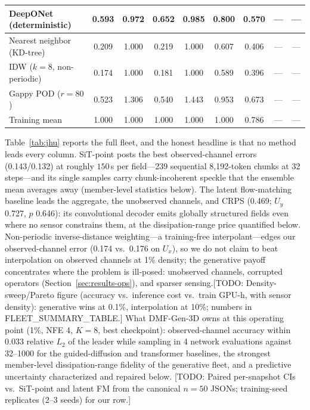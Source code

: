 \documentclass{article} %
\newcommand{\todo}[1]{{\color{red}[TODO: #1]}}
\newcommand{\model}{DMF-Gen-3D}
\begin{document}
\begin{table}[tbp]
\begin{center}
\begin{tabular}{lcccccccc}
DeepONet (deterministic) & 0.593 & 0.972 & 0.652 & 0.985 & 0.800 & 0.570 & --- & --- \\
\midrule
Nearest neighbor (KD-tree) & 0.209 & 1.000 & 0.219 & 1.000 & 0.607 & 0.406 & --- & --- \\
IDW ($k{=}8$, non-periodic) & 0.174 & 1.000 & 0.181 & 1.000 & 0.589 & 0.396 & --- & --- \\
Gappy POD ($r{=}80$) & 0.523 & 1.306 & 0.540 & 1.443 & 0.953 & 0.673 & --- & --- \\
Training mean & 1.000 & 1.000 & 1.000 & 1.000 & 1.000 & 0.786 & --- & --- \\
\bottomrule
\end{tabular}
\end{center}
\end{table}

Table~\ref{tab:jhu} reports the full fleet, and the honest headline is that no method leads every column. SiT-point posts the best observed-channel errors (0.143/0.132) at roughly $150$\,s per field---239 sequential 8{,}192-token chunks at 32 steps---and its single samples carry chunk-incoherent speckle that the ensemble mean averages away (member-level statistics below). The latent flow-matching baseline leads the aggregate, the unobserved channels, and CRPS (0.469; $U_y$ 0.727, $p$ 0.646): its convolutional decoder emits globally structured fields even where no sensor constrains them, at the dissipation-range price quantified below. Non-periodic inverse-distance weighting---a training-free interpolant---edges our observed-channel error (0.174 vs.\ 0.176 on $U_x$), so we do not claim to beat interpolation on observed channels at 1\% density; the generative payoff concentrates where the problem is ill-posed: unobserved channels, corrupted operators (Section~\ref{sec:results-ops}), and sparser sensing.\todo{Density-sweep/Pareto figure (accuracy vs.\ inference cost vs.\ train GPU-h, with sensor density): generative wins at 0.1\%, interpolation at 10\%; numbers in FLEET\_SUMMARY\_TABLE.} What \model{} owns at this operating point (1\%, NFE 4, $K{=}8$, best checkpoint): observed-channel accuracy within 0.033 relative $L_2$ of the leader while sampling in 4 network evaluations against 32--1000 for the guided-diffusion and transformer baselines, the strongest member-level dissipation-range fidelity of the generative fleet, and a predictive uncertainty characterized and repaired below. \todo{Paired per-snapshot CIs vs.\ SiT-point and latent FM from the canonical $n{=}50$ JSONs; training-seed replicates (2--3 seeds) for our row.}
\end{document}
